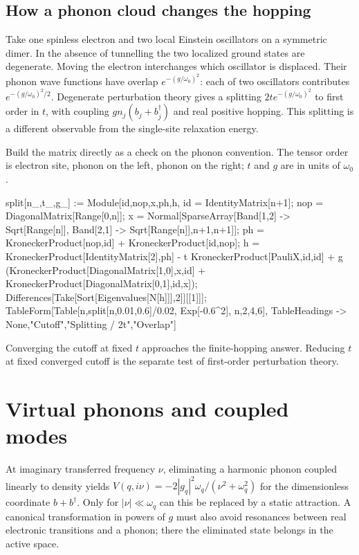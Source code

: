 \subsection{How a phonon cloud changes the hopping}
Take one spinless electron and two local Einstein oscillators on a
symmetric dimer. In the absence of tunnelling the two localized
ground states are degenerate. Moving the electron interchanges which
oscillator is displaced. Their phonon wave functions have overlap
$e^{-(g/\omega_0)^2}$: each of two oscillators contributes
$e^{-(g/\omega_0)^2/2}$. Degenerate perturbation theory gives a
splitting $2t e^{-(g/\omega_0)^2}$ to first order in $t$, with coupling
$g n_j(b_j+b_j^\dagger)$ and real positive hopping. This splitting is
a different observable from the single-site relaxation energy.

Build the matrix directly as a check on the phonon convention. The
tensor order is electron site, phonon on the left, phonon on the
right; $t$ and $g$ are in units of $\omega_0$.
\begin{wl}
split[n_,t_,g_] := Module[{id,nop,x,ph,h},
  id = IdentityMatrix[n+1]; nop = DiagonalMatrix[Range[0,n]];
  x = Normal[SparseArray[{Band[{1,2}] -> Sqrt[Range[n]],
                  Band[{2,1}] -> Sqrt[Range[n]]},{n+1,n+1}]];
  ph = KroneckerProduct[nop,id] + KroneckerProduct[id,nop];
  h = KroneckerProduct[IdentityMatrix[2],ph] -
      t KroneckerProduct[PauliX,id,id] +
      g (KroneckerProduct[DiagonalMatrix[{1,0}],x,id] +
         KroneckerProduct[DiagonalMatrix[{0,1}],id,x]);
  Differences[Take[Sort[Eigenvalues[N[h]]],2]][[1]]];
TableForm[Table[{n,split[n,0.01,0.6]/0.02, Exp[-0.6^2]}, {n,{2,4,6}}],
 TableHeadings -> {None,{"Cutoff","Splitting / 2t","Overlap"}}]
\end{wl}
Converging the cutoff at fixed $t$ approaches the finite-hopping
answer. Reducing $t$ at fixed converged cutoff is the separate test
of first-order perturbation theory.

\section{Virtual phonons and coupled modes}
At imaginary transferred frequency $\nu$, eliminating a harmonic
phonon coupled linearly to density yields
$V(q,i\nu)=-2|g_q|^2\omega_q/(\nu^2+\omega_q^2)$ for the dimensionless
coordinate $b+b^\dagger$. Only for $|\nu|\ll\omega_q$ can this be
replaced by a static attraction. A canonical transformation in powers
of $g$ must also avoid resonances between real electronic transitions
and a phonon; there the eliminated state belongs in the active space.

